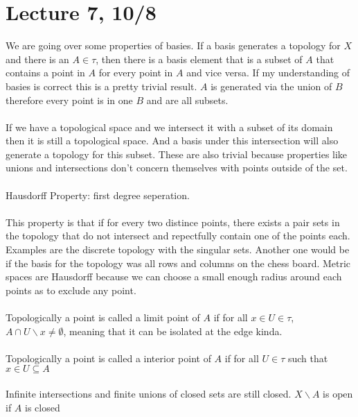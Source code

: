 \documentclass[12pt]{article}
\begin{document}
\newpage
\section{Lecture 7, 10/8}

We are going over some properties of basies. If a basis generates a topology for $X$ and there is an $A \in \tau$, then there is a basis element that is a subset of $A$ that contains a point in $A$ for every point in $A$ and vice versa. If my understanding of basies is correct this is a pretty trivial result. $A$ is generated via the union of $B$ therefore every point is in one $B$ and are all subsets. \\\\
If we have a topological space and we intersect it with a subset of its domain then it is still a topological space. And a basis under this intersection will also generate a topology for this subset. These are also trivial because properties like unions and intersections don't concern themselves with points outside of the set. \\\\
Hausdorff Property: first degree seperation. \\\\
This property is that if for every two distince points, there exists a pair sets in the topology that do not intersect and repectfully contain one of the points each. Examples are the discrete topology with the singular sets. Another one would be if the basis for the topology was all rows and columns on the chess board. Metric spaces are Hausdorff because we can choose a small enough radius around each points as to exclude any point.\\\\
Topologically a point is called a limit point of $A$ if for all $x \in U \in \tau$, $A \cap U \backslash x \neq \emptyset$, meaning that it can be isolated at the edge kinda. \\\\
Topologically a point is called a interior point of $A$ if for all  $U \in \tau$ such that $x \in U \subseteq A$\\\\
Infinite intersections and finite unions of closed sets are still closed. $X \backslash A$ is open if $A$ is closed 
\end{document}
